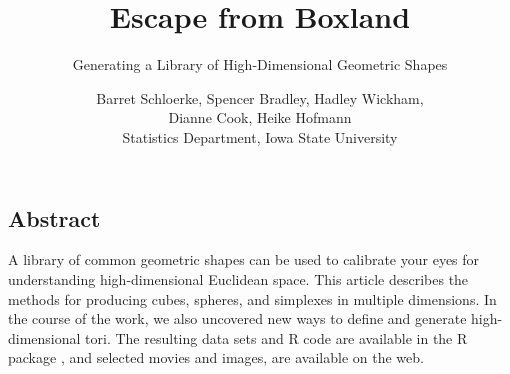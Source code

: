 \documentclass[a4paper]{report}
\begin{document}
\begin{article}


\title{Escape from Boxland
}
\subtitle{Generating a Library of High-Dimensional Geometric Shapes
}
\author{Barret Schloerke, Spencer Bradley,  Hadley Wickham, \\
Dianne Cook, Heike Hofmann\\
Statistics Department, Iowa State University
} 

\maketitle





\section{Abstract}
A library of common geometric shapes can be used to calibrate your eyes for understanding
high-dimensional Euclidean space. This article describes the methods
for producing cubes, spheres, and simplexes in multiple
dimensions. In the course of the work, we also uncovered new ways to
define and generate high-dimensional tori. The resulting data sets
and R code are available in the R package , and selected
movies and images, are available on the web.


\end{article}
\end{document}
